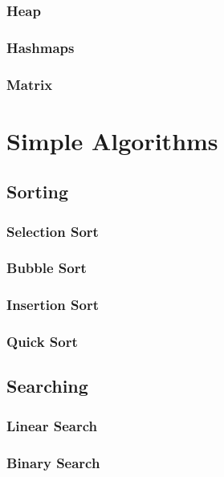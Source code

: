 \documentclass[12pt,a4paper]{book}
\begin{document}
				\subsection{Heap}

			\subsection{Hashmaps}

			\subsection{Matrix}


	\chapter{Simple Algorithms} \label{chap:simple-algorithms}
		\section{Sorting}
			\subsection{Selection Sort}

			\subsection{Bubble Sort}

			\subsection{Insertion Sort}

			\subsection{Quick Sort}

		\section{Searching}
			\subsection{Linear Search}

			\subsection{Binary Search}
\end{document}
